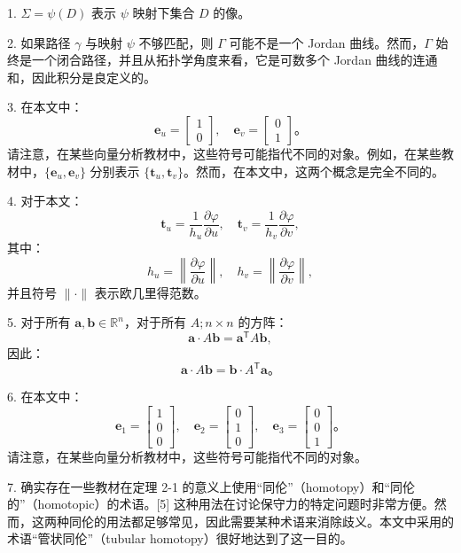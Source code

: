 1. \(\Sigma = \psi(D)\) 表示 \(\psi\) 映射下集合 \(D\) 的像。

2. 如果路径 \(\gamma\) 与映射 \(\psi\) 不够匹配，则 \(\Gamma\) 可能不是一个 Jordan 曲线。然而，\(\Gamma\) 始终是一个闭合路径，并且从拓扑学角度来看，它是可数多个 Jordan 曲线的连通和，因此积分是良定义的。

3. 在本文中：
   \[
   \mathbf{e}_u = \begin{bmatrix}1 \\ 0\end{bmatrix}, \quad \mathbf{e}_v = \begin{bmatrix}0 \\ 1\end{bmatrix}。
   \]
   请注意，在某些向量分析教材中，这些符号可能指代不同的对象。例如，在某些教材中，\(\{\mathbf{e}_u, \mathbf{e}_v\}\) 分别表示 \(\{\mathbf{t}_u, \mathbf{t}_v\}\)。然而，在本文中，这两个概念是完全不同的。

4. 对于本文：
   \[
   \mathbf{t}_u = \frac{1}{h_u} \frac{\partial \varphi}{\partial u}, \quad \mathbf{t}_v = \frac{1}{h_v} \frac{\partial \varphi}{\partial v},
   \]
   其中：
   \[
   h_u = \left\| \frac{\partial \varphi}{\partial u} \right\|, \quad h_v = \left\| \frac{\partial \varphi}{\partial v} \right\|,
   \]
   并且符号 \(\|\cdot\|\) 表示欧几里得范数。

5. 对于所有 \(\mathbf{a}, \mathbf{b} \in \mathbb{R}^n\)，对于所有 \(A; n \times n\) 的方阵：
   \[
   \mathbf{a} \cdot A \mathbf{b} = \mathbf{a}^\mathsf{T} A \mathbf{b},
   \]
   因此：
   \[
   \mathbf{a} \cdot A \mathbf{b} = \mathbf{b} \cdot A^\mathsf{T} \mathbf{a}。
   \]

6. 在本文中：
   \[
   \mathbf{e}_1 = \begin{bmatrix}1 \\ 0 \\ 0\end{bmatrix}, \quad \mathbf{e}_2 = \begin{bmatrix}0 \\ 1 \\ 0\end{bmatrix}, \quad \mathbf{e}_3 = \begin{bmatrix}0 \\ 0 \\ 1\end{bmatrix}。
   \]
   请注意，在某些向量分析教材中，这些符号可能指代不同的对象。

7. 确实存在一些教材在定理 2-1 的意义上使用“同伦”（homotopy）和“同伦的”（homotopic）的术语。[5] 这种用法在讨论保守力的特定问题时非常方便。然而，这两种同伦的用法都足够常见，因此需要某种术语来消除歧义。本文中采用的术语“管状同伦”（tubular homotopy）很好地达到了这一目的。